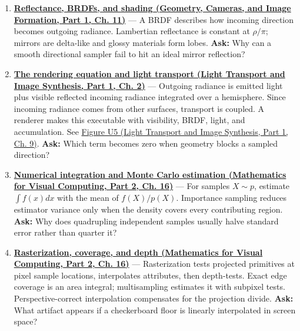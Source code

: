 \begin{enumerate}
\item
  \textbf{\href{../03-Geometry-Cameras-and-Image-Formation-P01/main.pdf\#nameddest=03-visual-computing-i-ch004-reflectance-brdfs-and-shading}{Reflectance, BRDFs, and shading (Geometry, Cameras, and Image Formation, Part 1, Ch. 11)}} --- A BRDF describes how incoming direction becomes outgoing radiance. Lambertian reflectance is constant at \(\rho/\pi\); mirrors are delta-like and glossy materials form lobes. \textbf{Ask:} Why can a smooth directional sampler fail to hit an ideal mirror reflection?
\item
  \textbf{\href{../04-Light-Transport-and-Image-Synthesis-P01/main.pdf\#nameddest=03-visual-computing-i-ch007-the-rendering-equation-and-light-transport}{The rendering equation and light transport (Light Transport and Image Synthesis, Part 1, Ch. 2)}} --- Outgoing radiance is emitted light plus visible reflected incoming radiance integrated over a hemisphere. Since incoming radiance comes from other surfaces, transport is coupled. A renderer makes this executable with visibility, BRDF, light, and accumulation. See \href{../04-Light-Transport-and-Image-Synthesis-P01/main.pdf\#nameddest=04-visual-computing-ii-ch035-figure-u5---a-direct-light-renderer-makes-the-pipeline-executable}{Figure U5 (Light Transport and Image Synthesis, Part 1, Ch. 9)}. \textbf{Ask:} Which term becomes zero when geometry blocks a sampled direction?
\item
  \textbf{\href{../02-Mathematics-for-Visual-Computing-P02/main.pdf\#nameddest=03-visual-computing-i-ch012-numerical-integration-and-monte-carlo-estimation}{Numerical integration and Monte Carlo estimation (Mathematics for Visual Computing, Part 2, Ch. 16)}} --- For samples \(X\sim p\), estimate \(\int f(x)dx\) with the mean of \(f(X)/p(X)\). Importance sampling reduces estimator variance only when the density covers every contributing region. \textbf{Ask:} Why does quadrupling independent samples usually halve standard error rather than quarter it?
\item
  \textbf{\href{../02-Mathematics-for-Visual-Computing-P02/main.pdf\#nameddest=03-visual-computing-i-ch012-rasterization-coverage-and-depth}{Rasterization, coverage, and depth (Mathematics for Visual Computing, Part 2, Ch. 16)}} --- Rasterization tests projected primitives at pixel sample locations, interpolates attributes, then depth-tests. Exact edge coverage is an area integral; multisampling estimates it with subpixel tests. Perspective-correct interpolation compensates for the projection divide. \textbf{Ask:} What artifact appears if a checkerboard floor is linearly interpolated in screen space?

\end{enumerate}
